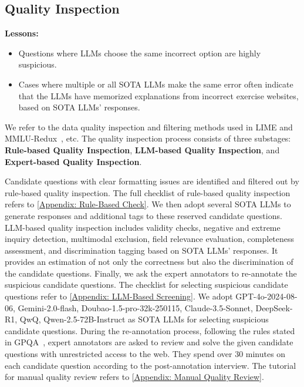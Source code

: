 \subsection{Quality Inspection}
\label{Sec: Quality-Inspection}

\begin{tcolorbox}[colframe=boxcolor,colback=white,boxrule=0.5mm,arc=0mm]
{\Large \textcolor{bulbcolor}{\faLightbulbO}}  \textbf{Lessons:}
\begin{itemize}
    \item Questions where LLMs choose the same incorrect option are highly suspicious.
    \item Cases where multiple or all SOTA LLMs make the same error often indicate that the LLMs have memorized explanations from incorrect exercise websites, based on SOTA LLMs' responses.
\end{itemize}
\end{tcolorbox}
We refer to the data quality inspection and filtering methods used in LIME and MMLU-Redux~\cite{zhu2024lime,gema2024we,wu2024comparativestudyreasoningpatterns}, etc. The quality inspection process consists of three substages: \textbf{Rule-based Quality Inspection}, \textbf{LLM-based Quality Inspection}, and \textbf{Expert-based Quality Inspection}.

Candidate questions with clear formatting issues are identified and filtered out by rule-based quality inspection. 
The full checklist of rule-based quality inspection refers to \autoref{Appendix: Rule-Based Check}.
We then adopt several SOTA LLMs to generate responses and additional tags to these reserved candidate questions.
LLM-based quality inspection includes validity checks, negative and extreme inquiry detection, multimodal exclusion, field relevance evaluation, completeness assessment, and discrimination tagging based on SOTA LLMs' responses.
It provides an estimation of not only the correctness but also the discrimination of the candidate questions.
Finally, we ask the expert annotators to re-annotate the suspicious candidate questions.
The checklist for selecting suspicious candidate questions refer to \autoref{Appendix: LLM-Based Screening}.
We adopt GPT-4o-2024-08-06, Gemini-2.0-flash, Doubao-1.5-pro-32k-250115, Claude-3.5-Sonnet, DeepSeek-R1, QwQ, Qwen-2.5-72B-Instruct as SOTA LLMs for selecting suspicious candidate questions.
During the re-annotation process, following the rules stated in GPQA~\citep{rein2023gpqa}, expert annotators are asked to review and solve the given candidate questions with unrestricted access to the web.
They spend over 30 minutes on each candidate question according to the post-annotation interview.
The tutorial for manual quality review refers to \autoref{Appendix: Manual Quality Review}.



